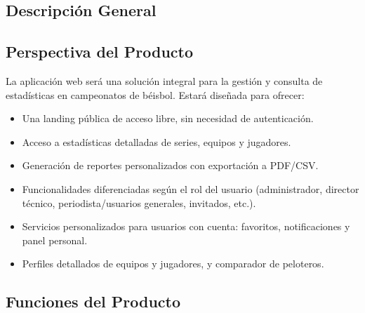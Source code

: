 \documentclass{report}
\begin{document}
    \newpage

    \begin{center}
        \section*{Descripción General}
    \end{center}

        \subsection*{Perspectiva del Producto}
        La aplicación web será una solución integral para la gestión y consulta de estadísticas en campeonatos de 
        béisbol. Estará diseñada para ofrecer:
        \begin{itemize}
            \item Una landing pública de acceso libre, sin necesidad de autenticación.
            \item Acceso a estadísticas detalladas de series, equipos y jugadores.
            \item Generación de reportes personalizados con exportación a PDF/CSV.
            \item Funcionalidades diferenciadas según el rol del usuario (administrador, director técnico, 
            periodista/usuarios generales, invitados, etc.).
            \item Servicios personalizados para usuarios con cuenta: favoritos, notificaciones y panel personal.
            \item Perfiles detallados de equipos y jugadores, y comparador de peloteros.
        \end{itemize}

        \subsection*{Funciones del Producto}
        
\end{document}
